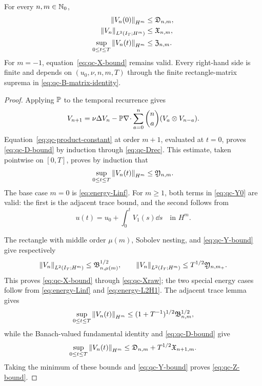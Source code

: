 \begin{lemma}
\label{lem:qc-closed-velocity-majorants}
For every \(n,m\in\mathbb N_0\),
\begin{align}
 \left\lVert V_n(0)\right\rVert_{H^m}&\le\mathfrak D_{n,m},
 \label{eq:qc-D-bound}\\
 \left\lVert V_n\right\rVert_{L^2(I_T;H^m)}&\le\mathfrak X_{n,m},
 \label{eq:qc-X-bound}\\
 \sup_{0\le t\le T}\left\lVert V_n(t)\right\rVert_{H^m}
 &\le\mathfrak Z_{n,m}.
 \label{eq:qc-Z-bound}
\end{align}
For \(m=-1\), equation~\eqref{eq:qc-X-bound} remains valid.  Every
right-hand side is finite and depends on \((u_0,\nu,n,m,T)\) through the
finite rectangle-matrix suprema in \eqref{eq:qc-B-matrix-identity}.
\end{lemma}

\begin{proof}
Applying \(\mathbb P\) to the temporal recurrence gives
\begin{equation}
 V_{n+1}=\nu\Delta V_n
 -\mathbb P\nabla\!\cdot\sum_{a=0}^{n}\binom na
 (V_a\otimes V_{n-a}).
 \label{eq:qc-projected-temporal-recurrence}
\end{equation}
Equation~\eqref{eq:qc-product-constant} at order \(m+1\), evaluated at
\(t=0\), proves \eqref{eq:qc-D-bound} by induction through
\eqref{eq:qc-Drec}.  This estimate, taken pointwise on \([0,T]\),
proves by induction that
\begin{equation}
 \sup_{0\le t\le T}\left\lVert V_n(t)\right\rVert_{H^m}
 \le\mathfrak Y_{n,m}.
 \label{eq:qc-Y-bound}
\end{equation}
The base case \(m=0\) is \eqref{eq:energy-Linf}.  For \(m\ge1\), both
terms in \eqref{eq:qc-Y0} are valid: the first is the adjacent trace bound,
and the second follows from
\[
 u(t)=u_0+\int_0^tV_1(s)\dd s
 \quad\text{in }H^m.
\]

The rectangle with middle order \(\mu(m)\), Sobolev nesting, and
\eqref{eq:qc-Y-bound} give respectively
\[
 \left\lVert V_n\right\rVert_{L^2(I_T;H^m)}
 \le\mathfrak B_{n,\mu(m)}^{1/2},
 \qquad
 \left\lVert V_n\right\rVert_{L^2(I_T;H^m)}
 \le T^{1/2}\mathfrak Y_{n,m_+}.
\]
This proves \eqref{eq:qc-X-bound} through \eqref{eq:qc-Xraw}; the two
special energy cases follow from \eqref{eq:energy-Linf} and
\eqref{eq:energy-L2H1}.  The adjacent trace lemma gives
\[
 \sup_{0\le t\le T}\left\lVert V_n(t)\right\rVert_{H^m}
 \le(1+T^{-1})^{1/2}\mathfrak B_{n,m}^{1/2},
\]
while the Banach-valued fundamental identity and
\eqref{eq:qc-D-bound} give
\[
 \sup_{0\le t\le T}\left\lVert V_n(t)\right\rVert_{H^m}
 \le\mathfrak D_{n,m}+T^{1/2}\mathfrak X_{n+1,m}.
\]
Taking the minimum of these bounds and \eqref{eq:qc-Y-bound} proves
\eqref{eq:qc-Z-bound}.
\end{proof}

